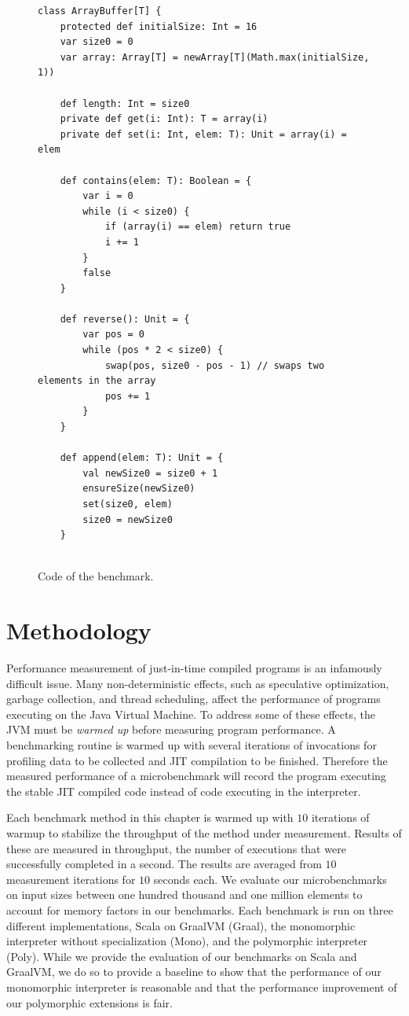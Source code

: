 \begin{figure}[!htb]
\begin{verbatim}
class ArrayBuffer[T] {
	protected def initialSize: Int = 16
	var size0 = 0
	var array: Array[T] = newArray[T](Math.max(initialSize, 1))
	
	def length: Int = size0
	private def get(i: Int): T = array(i)
	private def set(i: Int, elem: T): Unit = array(i) = elem
	
	def contains(elem: T): Boolean = {
		var i = 0
		while (i < size0) {
			if (array(i) == elem) return true
			i += 1
		}
		false
	}
	
	def reverse(): Unit = {
		var pos = 0
		while (pos * 2 < size0) {
			swap(pos, size0 - pos - 1) // swaps two elements in the array
			pos += 1
		}
	}
	
	def append(elem: T): Unit = {
		val newSize0 = size0 + 1
		ensureSize(newSize0)
		set(size0, elem)
		size0 = newSize0
	}
	

\end{verbatim}
\caption{Code of the  benchmark.}
\label{example:arraybuffer-benchmark}
\end{figure}

\section{Methodology}

Performance measurement of just-in-time compiled programs is an infamously difficult issue\cite{java:performance-analysis,java:statistically-rigor-performance-analysis}.
Many non-deterministic effects, such as speculative optimization, garbage collection, and thread scheduling, affect the performance of programs executing on the Java Virtual Machine.
To address some of these effects, the JVM must be \textit{warmed up} before measuring program performance.
A benchmarking routine is warmed up with several iterations of invocations for profiling data to be collected and JIT compilation to be finished.
Therefore the measured performance of a microbenchmark will record the program executing the stable JIT compiled code instead of code executing in the interpreter.

Each benchmark method in this chapter is warmed up with $10$ iterations of warmup to stabilize the throughput of the method under measurement.
Results of these are measured in throughput, the number of executions that were successfully completed in a second.
The results are averaged from $10$ measurement iterations for $10$ seconds each.
We evaluate our microbenchmarks on input sizes between one hundred thousand and one million elements to account for memory factors in our benchmarks. 
Each benchmark is run on three different implementations, Scala on GraalVM (Graal), the monomorphic interpreter without specialization (Mono), and the polymorphic interpreter (Poly).
While we provide the evaluation of our benchmarks on Scala and GraalVM, we do so to provide a baseline to show that the performance of our monomorphic interpreter is reasonable and that the performance improvement of our polymorphic extensions is fair.

